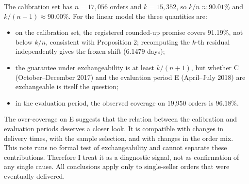 \documentclass[11pt]{article}
\newcommand{\1}{\mathbf 1}
\begin{document}
The calibration set has \(n=17{,}056\) orders and \(k=15{,}352\), so \(k/n\approx90.01\%\) and \(k/(n+1)\approx90.00\%\). For the linear model the three quantities are:
\begin{itemize}\setlength{\itemsep}{0pt}
\item on the calibration set, the registered rounded-up promise covers 91.19\%, not below \(k/n\), consistent with Proposition 2; recomputing the \(k\)-th residual independently gives the frozen shift (6.1479 days);
\item the guarantee under exchangeability is at least \(k/(n+1)\), but whether C (October--December 2017) and the evaluation period E (April--July 2018) are exchangeable is itself the question;
\item in the evaluation period, the observed coverage on 19,950 orders is 96.18\%.
\end{itemize}

The over-coverage on E suggests that the relation between the calibration and evaluation periods deserves a closer look. It is compatible with changes in delivery times, with the sample selection, and with changes in the order mix. This note runs no formal test of exchangeability and cannot separate these contributions. Therefore I treat it as a diagnostic signal, not as confirmation of any single cause. All conclusions apply only to single-seller orders that were eventually delivered.
\end{document}
